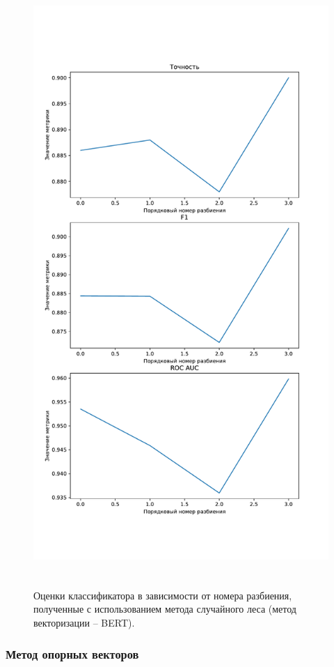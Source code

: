 \begin{figure}[H]
	\centering
	\includegraphics[height=23cm]{inc/plots/randomMetricsBert.pdf}
	\caption{ Оценки классификатора в зависимости от номера разбиения, полученные с использованием метода случайного леса (метод векторизации -- BERT). }
	\label{img:randomMetricsBert}
\end{figure}



\subsubsection{Метод опорных векторов }

